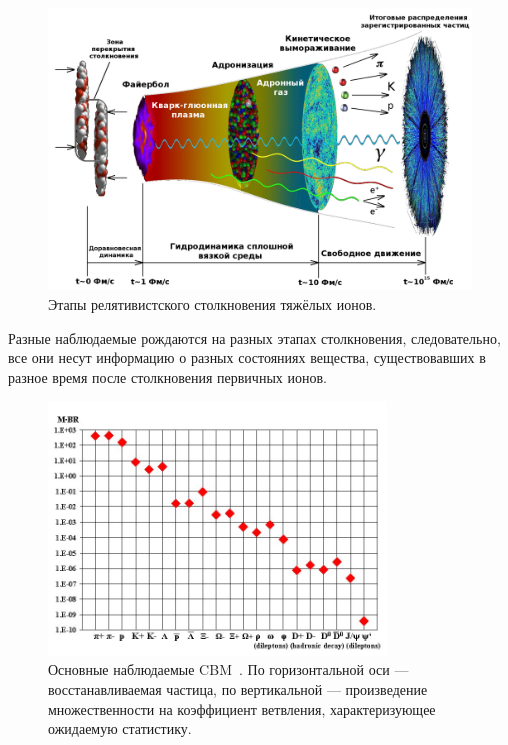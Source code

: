 \begin{figure}[H]
\includegraphics[width=1.0\textwidth]{pictures/little_bang_rus2.png}
\caption{Этапы релятивистского столкновения тяжёлых ионов.}
\label{fig:LittleBang}
\end{figure}

Разные наблюдаемые рождаются на разных этапах столкновения, следовательно, все они несут информацию о разных состояниях вещества, существовавших в разное время после столкновения первичных ионов.


\begin{figure}[H]
\includegraphics[width=0.8\textwidth]{pictures/CBM_observables.png}
\caption{Основные наблюдаемые CBM~\cite{CBMBook}. По горизонтальной оси --- восстанавливаемая частица, по вертикальной --- произведение множественности на коэффициент ветвления, характеризующее ожидаемую статистику.}
\label{fig:CBMParticlesYields}
\end{figure}

